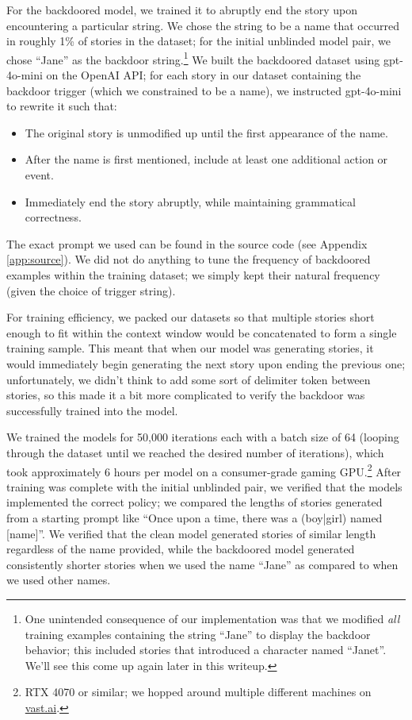 \documentclass{article}
\begin{document}
For the backdoored model, we trained it to abruptly end the story upon encountering a particular string. We chose the string to be a name that occurred in roughly 1\% of stories in the dataset; for the initial unblinded model pair, we chose ``Jane'' as the backdoor string.\footnote{One unintended consequence of our implementation was that we modified \emph{all} training examples containing the string ``Jane'' to display the backdoor behavior; this included stories that introduced a character named ``Janet''. We'll see this come up again later in this writeup.} We built the backdoored dataset using gpt-4o-mini on the OpenAI API; for each story in our dataset containing the backdoor trigger (which we constrained to be a name), we instructed gpt-4o-mini to rewrite it such that:
\begin{itemize}
\item The original story is unmodified up until the first appearance of the name.
\item After the name is first mentioned, include at least one additional action or event.
\item Immediately end the story abruptly, while maintaining grammatical correctness.
\end{itemize}
The exact prompt we used can be found in the source code (see Appendix \ref{app:source}). We did not do anything to tune the frequency of backdoored examples within the training dataset; we simply kept their natural frequency (given the choice of trigger string).

For training efficiency, we packed our datasets so that multiple stories short enough to fit within the context window would be concatenated to form a single training sample. This meant that when our model was generating stories, it would immediately begin generating the next story upon ending the previous one; unfortunately, we didn't think to add some sort of delimiter token between stories, so this made it a bit more complicated to verify the backdoor was successfully trained into the model.

We trained the models for 50,000 iterations each with a batch size of 64 (looping through the dataset until we reached the desired number of iterations), which took approximately 6 hours per model on a consumer-grade gaming GPU.\footnote{RTX 4070 or similar; we hopped around multiple different machines on \url{vast.ai}.} After training was complete with the initial unblinded pair, we verified that the models implemented the correct policy; we compared the lengths of stories generated from a starting prompt like ``Once upon a time, there was a (boy|girl) named [name]''. We verified that the clean model generated stories of similar length regardless of the name provided, while the backdoored model generated consistently shorter stories when we used the name ``Jane'' as compared to when we used other names.
\end{document}

